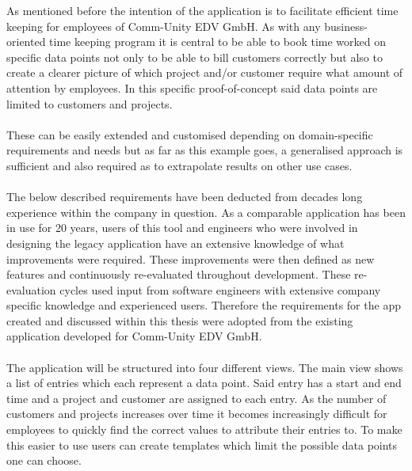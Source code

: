 
As mentioned before the intention of the application is to facilitate efficient time keeping 
for employees of Comm-Unity EDV GmbH. 
As with any business-oriented time keeping program it is central to be able to book 
time worked on specific data points not only to be able to bill customers correctly but also to 
create a clearer picture of which project and/or customer require what amount of attention by 
employees.
In this specific proof-of-concept said data points are limited to customers and projects.\paragraph{}
These can be easily extended and customised depending on domain-specific requirements and needs but as far 
as this example goes, a generalised approach is sufficient and also required as to extrapolate results 
on other use cases.\paragraph{}
The below described requirements have been deducted from decades long experience within the company in question.
As a comparable application has been in use for 20 years, users of this tool and engineers who were involved
in designing the legacy application have an extensive knowledge of what improvements were required.
These improvements were then defined as new features and continuously re-evaluated throughout development.
These re-evaluation cycles used input from software engineers with extensive company specific knowledge and
experienced users.
Therefore the requirements for the app created and discussed within this thesis were adopted from the existing
application developed for Comm-Unity EDV GmbH.\paragraph{}
The application will be structured into four different views. 
The main view shows a list of entries which each represent a data point.
Said entry has a start and end time and a project and customer are assigned to each entry. 
As the number of customers and projects increases over time it becomes increasingly difficult for 
employees to quickly find the correct values to attribute their entries to.
To make this easier to use users can create templates which limit the possible data points one can
choose.\paragraph{}
